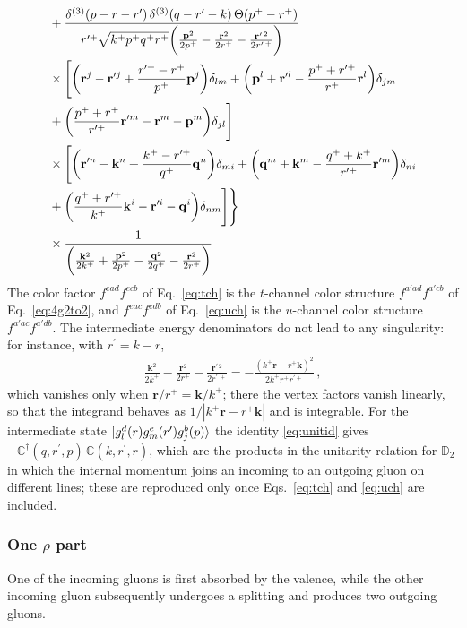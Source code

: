 \documentclass[a4paper,11pt]{article}
\def\v#1{\mathbf{#1}}
\def\mf#1{\mathbb{#1}}
\begin{document}
{\begin{align}
& +\frac{\delta^{(3)}(p-r-r^{\prime})\,\delta^{(3)}(q-r^{\prime}-k)\,\Theta(p^{+}-r^{+})}{r^{\prime +}\sqrt{k^{+}p^{+}q^{+}r^{+}}\bigg(\frac{\v{p}^{2}}{2p^{+}}-\frac{\v{r}^{2}}{2r^{+}}-\frac{\v{r}^{\prime\,2}}{2r^{\prime\,+}}\bigg)}\notag \\
& \times\Bigg[\bigg(\v{r}^{j}-\v{r}^{\prime j}+\frac{r^{\prime +}-r^{+}}{p^{+}}\v{p}^{j}\bigg)\delta_{lm}+\bigg(\v{p}^{l}+\v{r}^{\prime l}-\frac{p^{+}+r^{\prime +}}{r^{+}}\v{r}^{l}\bigg)\delta_{jm}\notag \\ & +\bigg(\frac{p^{+}+r^{+}}{r^{\prime +}}\v{r}^{\prime m}-\v{r}^{m}-\v{p}^{m}\bigg)\delta_{jl}\Bigg]\notag \\
& \times\Bigg[\bigg(\v{r}^{\prime n}-\v{k}^{n}+\frac{k^{+}-r^{\prime +}}{q^{+}}\v{q}^{n}\bigg)\delta_{mi}+\bigg(\v{q}^{m}+\v{k}^{m}-\frac{q^{+}+k^{+}}{r^{\prime +}}\v{r}^{\prime m}\bigg)\delta_{ni}\notag \\ & +\bigg(\frac{q^{+}+r^{\prime +}}{k^{+}}\v{k}^{i}-\v{r}^{\prime i}-\v{q}^{i}\bigg)\delta_{nm}\Bigg]\Bigg\}\notag \\
& \times \frac{1}{\bigg(\frac{\v{k}^{2}}{2k^{+}}+\frac{\v{p}^{2}}{2p^{+}}-\frac{\v{q}^{2}}{2q^{+}}-\frac{\v{r}^{2}}{2r^{+}}\bigg)}
\end{align}
The color factor $f^{ead}f^{ecb}$ of Eq.~\eqref{eq:tch} is the $t$-channel color structure $f^{a'ad}f^{a'cb}$ of Eq.~\eqref{eq:4g2to2}, and $f^{eac}f^{edb}$ of Eq.~\eqref{eq:uch} is the $u$-channel color structure $f^{a'ac}f^{a'db}$. The intermediate energy denominators do not lead to any singularity: for instance, with $r^{\prime}=k-r$,
\begin{align}
\frac{\v{k}^{2}}{2k^{+}}-\frac{\v{r}^{2}}{2r^{+}}-\frac{\v{r}^{\prime\,2}}{2r^{\prime\,+}} = -\frac{\left(k^{+}\v{r}-r^{+}\v{k}\right)^{2}}{2k^{+}r^{+}r^{\prime +}}\,,
\end{align}
which vanishes only when $\v{r}/r^{+}=\v{k}/k^{+}$; there the vertex factors vanish linearly, so that the integrand behaves as $1/|k^{+}\v{r}-r^{+}\v{k}|$ and is integrable. For the intermediate state $\ket{g^{d}_{l}(r)g^{e}_{m}(r^{\prime})g^{b}_{j}(p)}$ the identity \eqref{eq:unitid} gives $-\mf{C}^{\dagger}(q,r^{\prime},p)\,\mf{C}(k,r^{\prime},r)$, which are the products in the unitarity relation for $\mf{D}_{2}$ in which the internal momentum joins an incoming to an outgoing gluon on different lines; these are reproduced only once Eqs.~\eqref{eq:tch} and \eqref{eq:uch} are included.}

\subsubsection*{One $\rho$ part}
One of the incoming gluons is first absorbed by the valence, while the other incoming gluon subsequently undergoes a splitting and produces two outgoing gluons. 
\end{document}
